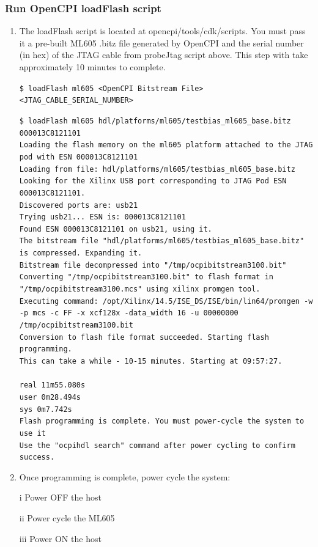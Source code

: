 \documentclass{article}
\newcommand{\shellcmd}[1]{\texttt{\$ #1\\}}
\newcommand{\terminaloutput}[1]{\texttt{#1}}
\begin{document}
\subsubsection*{Run OpenCPI loadFlash script}
\begin{enumerate}
\item The loadFlash script is located at opencpi/tools/cdk/scripts. You must pass it a pre-built ML605 .bitz file generated by OpenCPI and the serial number (in hex) of the JTAG cable from probeJtag script above. This step with take approximately 10 minutes to complete.\par\smallskip
{}\par
\noindent\shellcmd{loadFlash ml605 <OpenCPI Bitstream File> <JTAG\_CABLE\_SERIAL\_NUMBER>}\par\smallskip
{}\par
\noindent\terminaloutput{\$ loadFlash ml605 hdl/platforms/ml605/testbias\_ml605\_base.bitz 000013C8121101\\
Loading the flash memory on the ml605 platform attached to the JTAG pod with ESN 000013C8121101\\
Loading from file: hdl/platforms/ml605/testbias\_ml605\_base.bitz\\
Looking for the Xilinx USB port corresponding to JTAG Pod ESN 000013C8121101.\\
Discovered ports are: usb21\\
Trying usb21... ESN is: 000013C8121101\\
Found ESN 000013C8121101 on usb21, using it.\\
The bitstream file "hdl/platforms/ml605/testbias\_ml605\_base.bitz" is compressed. Expanding it.\\
Bitstream file decompressed into "/tmp/ocpibitstream3100.bit"\\
Converting "/tmp/ocpibitstream3100.bit" to flash format in "/tmp/ocpibitstream3100.mcs" using xilinx promgen tool.\\
Executing command: /opt/Xilinx/14.5/ISE\_DS/ISE/bin/lin64/promgen -w -p mcs -c FF -x xcf128x -data\_width 16 -u 00000000 /tmp/ocpibitstream3100.bit\\
Conversion to flash file format succeeded. Starting flash programming.\\
This can take a while - 10-15 minutes. Starting at 09:57:27.\\ \\
real	11m55.080s\\
user	0m28.494s\\
sys	0m7.742s\\
Flash programming is complete. You must power-cycle the system to use it\\
Use the "ocpihdl search" command after power cycling to confirm success.}\par\bigskip
\item Once programming is complete, power cycle the system:
\item[i]Power OFF the host
\item[ii]Power cycle the ML605
\item[iii]Power ON the host
\end{enumerate}\par
\end{document}
